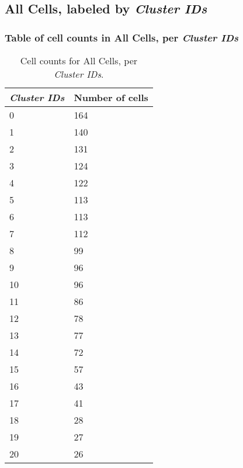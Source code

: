 \clearpage

\subsection{All Cells, labeled by \emph{Cluster IDs}}
\subsubsection{Table of cell counts in All Cells, per \emph{Cluster IDs}}\begin{table}[h]
\centering
\label{my-label}
\begin{tabular}{@{}ll@{}}
\toprule

\emph{Cluster IDs}& Number of cells \\ \midrule
0 & 164 \\

1 & 140 \\

2 & 131 \\

3 & 124 \\

4 & 122 \\

5 & 113 \\

6 & 113 \\

7 & 112 \\

8 & 99 \\

9 & 96 \\

10 & 96 \\

11 & 86 \\

12 & 78 \\

13 & 77 \\

14 & 72 \\

15 & 57 \\

16 & 43 \\

17 & 41 \\

18 & 28 \\

19 & 27 \\

20 & 26 \\
\bottomrule
\end{tabular}
\caption{Cell counts for All Cells, per \emph{Cluster IDs}.}
\end{table}

